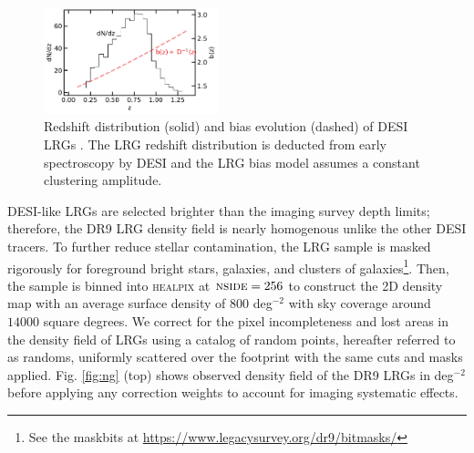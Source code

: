 \begin{figure}
    \centering
    \includegraphics[width=0.45\textwidth]{figures/nz_lrg.pdf}
    \caption{Redshift distribution (solid) and bias evolution (dashed) of DESI LRGs \citep{zhou2021clustering, zhou2022target}. The LRG redshift distribution is deducted from early spectroscopy by DESI and the LRG bias model assumes a constant clustering amplitude.}
    \label{fig:nz}
\end{figure}

DESI-like LRGs are selected brighter than the imaging survey depth limits; therefore, the DR9 LRG density field is nearly homogenous unlike the other DESI tracers. To further reduce stellar contamination, the LRG sample is masked rigorously for foreground bright stars, galaxies, and clusters of galaxies\footnote{See the maskbits at \url{https://www.legacysurvey.org/dr9/bitmasks/}}. Then, the sample is binned into \textsc{healpix} \citep{gorski2005healpix} at $\textsc{nside}=256$ to construct the 2D density map with an average surface density of $800$ deg$^{-2}$ with sky coverage around $14000$ square degrees. We correct for the pixel incompleteness and lost areas in the density field of LRGs using a catalog of random points, hereafter referred to as randoms, uniformly scattered over the footprint with the same cuts and masks applied. Fig. \ref{fig:ng} (top) shows observed density field of the DR9 LRGs in deg$^{-2}$ before applying any correction weights to account for imaging systematic effects.

